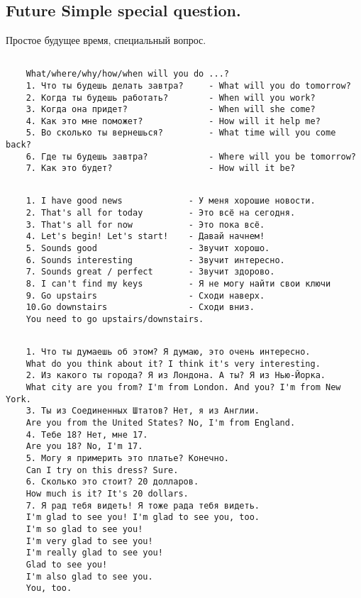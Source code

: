 \subsection{Future Simple special question.}
Простое будущее время, специальный вопрос.
\subsection*{}
\begin{verbatim}
    What/where/why/how/when will you do ...?
    1. Что ты будешь делать завтра?     - What will you do tomorrow?
    2. Когда ты будешь работать?        - When will you work?
    3. Когда она придет?                - When will she come?
    4. Как это мне поможет?             - How will it help me?
    5. Во сколько ты вернешься?         - What time will you come back?
    6. Где ты будешь завтра?            - Where will you be tomorrow?
    7. Как это будет?                   - How will it be?
\end{verbatim}

\subsection*{}
\begin{verbatim}
    1. I have good news             - У меня хорошие новости.
    2. That's all for today         - Это всё на сегодня.
    3. That's all for now           - Это пока всё.
    4. Let's begin! Let's start!    - Давай начнем!
    5. Sounds good                  - Звучит хорошо.
    6. Sounds interesting           - Звучит интересно.
    7. Sounds great / perfect       - Звучит здорово.
    8. I can't find my keys         - Я не могу найти свои ключи
    9. Go upstairs                  - Сходи наверх.
    10.Go downstairs                - Сходи вниз.
    You need to go upstairs/downstairs.
\end{verbatim}

\subsection*{}
\begin{verbatim}
    1. Что ты думаешь об этом? Я думаю, это очень интересно.
    What do you think about it? I think it's very interesting.
    2. Из какого ты города? Я из Лондона. А ты? Я из Нью-Йорка.
    What city are you from? I'm from London. And you? I'm from New York.
    3. Ты из Соединенных Штатов? Нет, я из Англии.
    Are you from the United States? No, I'm from England.
    4. Тебе 18? Нет, мне 17.
    Are you 18? No, I'm 17.
    5. Могу я примерить это платье? Конечно.
    Can I try on this dress? Sure.
    6. Сколько это стоит? 20 долларов.
    How much is it? It's 20 dollars.
    7. Я рад тебя видеть! Я тоже рада тебя видеть.
    I'm glad to see you! I'm glad to see you, too.
    I'm so glad to see you!
    I'm very glad to see you!
    I'm really glad to see you!
    Glad to see you!
    I'm also glad to see you.
    You, too.
\end{verbatim}

